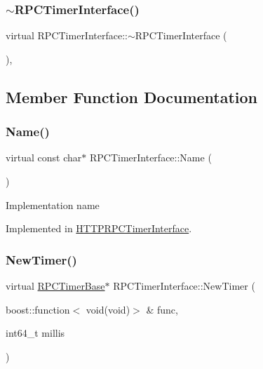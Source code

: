 \subsubsection{\texorpdfstring{$\sim$\+R\+P\+C\+Timer\+Interface()}{~RPCTimerInterface()}}
{\footnotesize\ttfamily virtual R\+P\+C\+Timer\+Interface\+::$\sim$\+R\+P\+C\+Timer\+Interface (\begin{DoxyParamCaption}{ }\end{DoxyParamCaption})\hspace{0.3cm}{\ttfamily [inline]}, {\ttfamily [virtual]}}



\subsection{Member Function Documentation}
\mbox{\label{class_r_p_c_timer_interface_afbb7a79b18bdbc1a6900ba8eb882c5b3}} 
\subsubsection{\texorpdfstring{Name()}{Name()}}
{\footnotesize\ttfamily virtual const char$\ast$ R\+P\+C\+Timer\+Interface\+::\+Name (\begin{DoxyParamCaption}{ }\end{DoxyParamCaption})\hspace{0.3cm}{\ttfamily [pure virtual]}}

Implementation name 

Implemented in \mbox{\hyperlink{class_h_t_t_p_r_p_c_timer_interface_a79d0040425233253bea84673c3cae97e}{H\+T\+T\+P\+R\+P\+C\+Timer\+Interface}}.

\mbox{\label{class_r_p_c_timer_interface_a4588767c14008834cb7f035a3f2de2e9}} 
\subsubsection{\texorpdfstring{New\+Timer()}{NewTimer()}}
{\footnotesize\ttfamily virtual \mbox{\hyperlink{class_r_p_c_timer_base}{R\+P\+C\+Timer\+Base}}$\ast$ R\+P\+C\+Timer\+Interface\+::\+New\+Timer (\begin{DoxyParamCaption}\item[{boost\+::function$<$ void(void)$>$ \&}]{func,  }\item[{int64\+\_\+t}]{millis }\end{DoxyParamCaption})\hspace{0.3cm}{\ttfamily [pure virtual]}}

